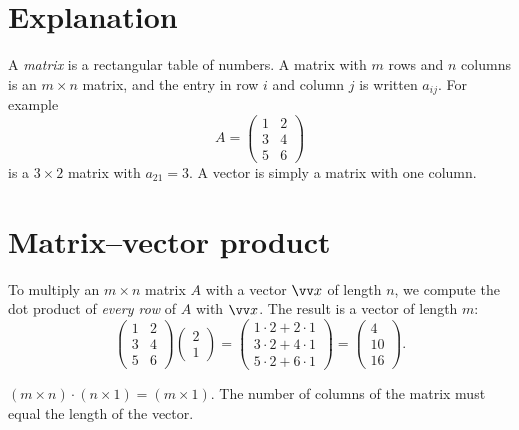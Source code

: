 \label{ch:matrices}

\section*{Explanation}
A \emph{matrix} is a rectangular table of numbers. A matrix with $m$ rows and $n$ columns is an $m\times n$ matrix, and the entry in row $i$ and column $j$ is written $a_{ij}$. For example
\[
A=\begin{pmatrix}1&2\\3&4\\5&6\end{pmatrix}
\]
is a $3\times2$ matrix with $a_{21}=3$. A vector is simply a matrix with one column.

\section*{Matrix--vector product}
To multiply an $m\times n$ matrix $A$ with a vector $\vv x$ of length $n$, we compute the dot product of \emph{every row} of $A$ with $\vv x$. The result is a vector of length $m$:
\[
\begin{pmatrix}1&2\\3&4\\5&6\end{pmatrix}\begin{pmatrix}2\\1\end{pmatrix}
=\begin{pmatrix}1\cdot2+2\cdot1\\3\cdot2+4\cdot1\\5\cdot2+6\cdot1\end{pmatrix}
=\begin{pmatrix}4\\10\\16\end{pmatrix}.
\]
\begin{keyidea}
$(m\times n)\cdot(n\times1)=(m\times1)$. The number of columns of the matrix must equal the length of the vector.
\end{keyidea}

